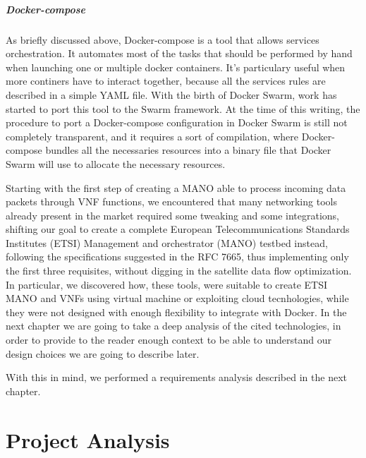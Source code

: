 \documentclass[10pt]{book}
\begin{document}
\paragraph{Docker-compose} As briefly discussed above, Docker-compose is a tool
that allows services orchestration. It automates most of the tasks that should
be performed by hand when launching one or multiple docker containers. It's
particulary useful when more continers have to interact together,
because all the services rules are described in a simple YAML file. With
the birth of Docker Swarm, work has started to port this tool to the Swarm
framework. At the time of this writing, the procedure to port a Docker-compose
configuration in Docker Swarm is still not completely transparent, and it
requires a sort of compilation, where Docker-compose bundles all the necessaries
resources into a binary file that Docker Swarm will use to allocate the
necessary resources.

\vspace{0.5cm}

Starting with the first step of creating a MANO able to process incoming data
packets through VNF functions, we encountered that many networking tools already
present in the market required some tweaking and some integrations, shifting our
goal to create a complete European Telecommunications Standards Institutes
(ETSI) Management and orchestrator (MANO) testbed instead, following the
specifications suggested in the RFC 7665, thus implementing only the first three
requisites, without digging in the satellite data flow optimization. In
particular, we discovered how, these tools, were suitable to create ETSI MANO
and VNFs using virtual machine or exploiting cloud tecnhologies, while they were
not designed with enough flexibility to integrate with Docker. In the next
chapter we are going to take a deep analysis of the cited technologies, in order
to provide to the reader enough context to be able to understand our design
choices we are going to describe later.


\noindent With this in mind, we performed a requirements analysis described in
the next chapter.

\chapter{Project Analysis}
\label{chap:prjan}
\end{document}
